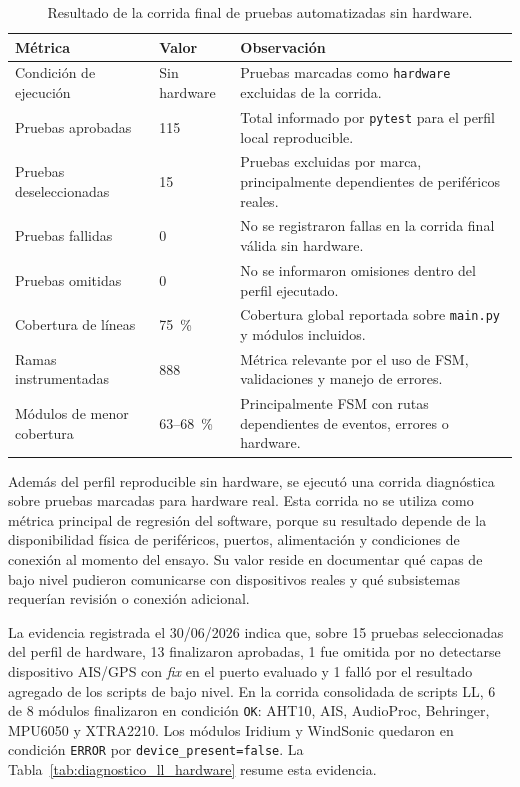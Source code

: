 \begin{table}[htpb]
\centering
\small
\caption{Resultado de la corrida final de pruebas automatizadas sin hardware.}
\label{tab:metricas_tests_automatizados}
\begingroup
\renewcommand{\arraystretch}{1.25}
\begin{tabularx}{\textwidth}{p{} p{} X}
\toprule
\textbf{Métrica} & \textbf{Valor} & \textbf{Observación} \\
\midrule
Condición de ejecución & Sin hardware & Pruebas marcadas como \texttt{hardware} excluidas de la corrida. \\
Pruebas aprobadas & 115 & Total informado por \texttt{pytest} para el perfil local reproducible. \\
Pruebas deseleccionadas & 15 & Pruebas excluidas por marca, principalmente dependientes de periféricos reales. \\
Pruebas fallidas & 0 & No se registraron fallas en la corrida final válida sin hardware. \\
Pruebas omitidas & 0 & No se informaron omisiones dentro del perfil ejecutado. \\
Cobertura de líneas & 75~\% & Cobertura global reportada sobre \texttt{main.py} y módulos incluidos. \\
Ramas instrumentadas & 888 & Métrica relevante por el uso de FSM, validaciones y manejo de errores. \\
Módulos de menor cobertura & 63--68~\% & Principalmente FSM con rutas dependientes de eventos, errores o hardware. \\
\bottomrule
\end{tabularx}
\endgroup
\end{table}

Además del perfil reproducible sin hardware, se ejecutó una corrida diagnóstica sobre pruebas marcadas para hardware real. Esta corrida no se utiliza como métrica principal de regresión del software, porque su resultado depende de la disponibilidad física de periféricos, puertos, alimentación y condiciones de conexión al momento del ensayo. Su valor reside en documentar qué capas de bajo nivel pudieron comunicarse con dispositivos reales y qué subsistemas requerían revisión o conexión adicional.

La evidencia registrada el 30/06/2026 indica que, sobre 15 pruebas seleccionadas del perfil de hardware, 13 finalizaron aprobadas, 1 fue omitida por no detectarse dispositivo AIS/GPS con \textit{fix} en el puerto evaluado y 1 falló por el resultado agregado de los scripts de bajo nivel. En la corrida consolidada de scripts LL, 6 de 8 módulos finalizaron en condición \texttt{OK}: AHT10, AIS, AudioProc, Behringer, MPU6050 y XTRA2210. Los módulos Iridium y WindSonic quedaron en condición \texttt{ERROR} por \texttt{device\_present=false}. La Tabla~\ref{tab:diagnostico_ll_hardware} resume esta evidencia.

